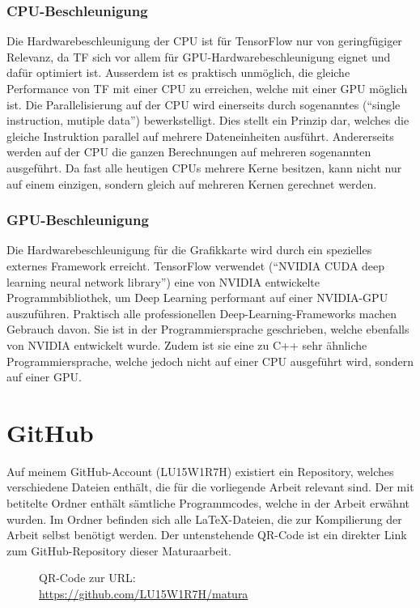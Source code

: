 \begin{appendices}
\subsection*{CPU-Beschleunigung}
Die Hardwarebeschleunigung der CPU ist für TensorFlow nur von geringfügiger
Relevanz, da TF sich vor allem für GPU-Hardwarebeschleunigung eignet
und dafür optimiert ist. Ausserdem ist es praktisch unmöglich, die gleiche
Performance von TF mit einer CPU zu erreichen, welche mit einer GPU möglich ist.
\para{}
Die Parallelisierung auf der CPU wird einerseits durch sogenanntes 
(``single instruction, mutiple data'') bewerkstelligt. Dies stellt ein Prinzip
dar, welches die gleiche Instruktion parallel auf mehrere Dateneinheiten
ausführt.
Andererseits werden auf der CPU die ganzen Berechnungen auf mehreren sogenannten
 ausgeführt. Da fast alle heutigen CPUs mehrere Kerne
besitzen, kann nicht nur auf einem einzigen, sondern gleich auf mehreren
Kernen gerechnet werden.

\subsection*{GPU-Beschleunigung}
Die Hardwarebeschleunigung für die Grafikkarte wird durch ein spezielles
externes Framework erreicht. TensorFlow verwendet  (``NVIDIA CUDA
deep learning neural network library'') eine von
NVIDIA entwickelte Programmbibliothek, um Deep Learning performant auf einer NVIDIA-GPU
auszuführen. Praktisch alle professionellen Deep-Learning-Frameworks machen
Gebrauch davon. Sie ist in der Programmiersprache
 geschrieben, welche ebenfalls von NVIDIA entwickelt wurde. Zudem
ist sie eine zu C++ sehr ähnliche Programmiersprache, welche jedoch nicht auf
einer CPU ausgeführt wird, sondern auf einer GPU.


\chapter{GitHub}
Auf meinem GitHub-Account (LU15W1R7H) existiert ein Repository, welches verschiedene
Dateien enthält, die für die vorliegende Arbeit relevant sind.
Der mit  betitelte Ordner enthält sämtliche
Programmcodes, welche in der Arbeit erwähnt wurden. Im Ordner 
befinden sich alle \LaTeX{}-Dateien, die zur Kompilierung der Arbeit selbst
benötigt werden. Der untenstehende QR-Code ist ein direkter Link zum
GitHub-Repository dieser Maturaarbeit.
\para{}
\begin{wrapfigure}{R}{3.5cm}
  \centering
  \caption{QR-Code zur URL:\\ \protect\url{https://github.com/LU15W1R7H/matura}}
\end{wrapfigure}



\end{appendices}

